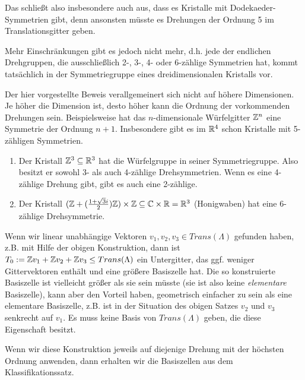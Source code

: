 \begin{remark}
Das schließt also insbesondere auch aus, dass es Kristalle mit Dodekaeder-Symmetrien gibt, denn ansonsten müsste es Drehungen der Ordnung 5 im Translationsgitter geben.

Mehr Einschränkungen gibt es jedoch nicht mehr, d.h. jede der endlichen Drehgruppen, die ausschließlich 2-, 3-, 4- oder 6-zählige Symmetrien hat, kommt tatsächlich in der Symmetriegruppe eines dreidimensionalen Kristalls vor.

Der hier vorgestellte Beweis verallgemeinert sich nicht auf höhere Dimensionen. Je höher die Dimension ist, desto höher kann die Ordnung der vorkommenden Drehungen sein. Beispielsweise hat das $n$-dimensionale Würfelgitter $\mathbb{Z}^n$ eine Symmetrie der Ordnung $n+1$. Insbesondere gibt es im $\mathbb{R}^4$ schon Kristalle mit 5-zähligen Symmetrien.
\end{remark}

\begin{example}
\begin{enumerate}
\item Der Kristall $\mathbb{Z}^3\subseteq\mathbb{R}^3$ hat die Würfelgruppe in seiner Symmetriegruppe. Also besitzt er sowohl 3- als auch 4-zählige Drehsymmetrien. Wenn es eine 4-zählige Drehung gibt, gibt es auch eine 2-zählige.
\item Der Kristall $(\mathbb{Z}+(\frac{1+\sqrt{3}i}{2})\mathbb{Z}) \times \mathbb{Z} \subseteq \mathbb{C}\times\mathbb{R} = \mathbb{R}^3$ (Honigwaben) hat eine 6-zählige Drehsymmetrie.
\end{enumerate}
\end{example}

\begin{remark}
Wenn wir linear unabhängige Vektoren $v_1,v_2,v_3\in Trans(\Lambda)$ gefunden haben, z.B. mit Hilfe der obigen Konstruktion, dann ist $T_0:=\mathbb{Z} v_1+\mathbb{Z} v_2+\mathbb{Z} v_3 \leq Trans(\Lambda)$ ein Untergitter, das ggf. weniger Gittervektoren enthält und eine größere Basiszelle hat. Die so konstruierte Basiszelle ist vielleicht größer als sie sein müsste (sie ist also keine \emph{elementare} Basiszelle), kann aber den Vorteil haben, geometrisch einfacher zu sein als eine elementare Basiszelle, z.B. ist in der Situation des obigen Satzes $v_2$ und $v_3$ senkrecht auf $v_1$. Es muss keine Basis von $Trans(\Lambda)$ geben, die diese Eigenschaft besitzt.

Wenn wir diese Konstruktion jeweils auf diejenige Drehung mit der höchsten Ordnung anwenden, dann erhalten wir die Basiszellen aus dem Klassifikationssatz.
\end{remark}

